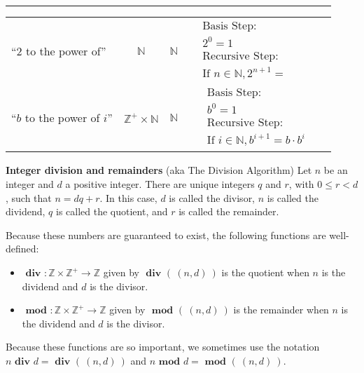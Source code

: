 \documentclass[12pt, oneside]{article}
\begin{document}
\begin{center}
\begin{tabular}{p{0.65in}ccp{2.4in}p{2.4in}}
{\begin{align*}
    \end{align*}}\\
\hline
``$2$ to the power of''& $\mathbb{N}$ & $\mathbb{N}$ & 
{\begin{align*}    
&\textrm{Basis Step:} \\
&2^0= 1 \\
&\textrm{Recursive Step:}\\
&\textrm{If } n \in \mathbb{N}, 2^{n+1} = \phantom{2 \cdot 2^n}
\end{align*}}\\
\hline
``$b$ to the power of $i$''& $\mathbb{Z}^+ \times \mathbb{N}$ & $\mathbb{N}$ & 
{\begin{align*}    
&\textrm{Basis Step:} \\
&b^0 = 1 \\
&\textrm{Recursive Step:}\\
&\textrm{If } i \in \mathbb{N}, b^{i+1} = b \cdot b^i
\end{align*}}
\end{tabular}
\end{center}

\newpage \newpage


{\bf Integer division and remainders} (aka The Division Algorithm) Let $n$ be an integer 
and $d$ a positive integer. There are unique integers $q$ and $r$, with $0 \leq r < d$, such that 
$n = dq + r$. In this case, $d$ is called the divisor, $n$ is called the dividend, 
$q$ is called the quotient, 
and $r$ is called the remainder. 

Because these numbers are guaranteed to exist, the following functions are well-defined: 
\begin{itemize}\setlength{\leftmargin}{-0.25in}
\item $\textbf{ div } : \mathbb{Z} \times \mathbb{Z}^+ \to \mathbb{Z}$ given by $\textbf{ div } ( ~(n,d)~)$ 
is the quotient when $n$ is the dividend and $d$ is the divisor.
\item $\textbf{ mod } : \mathbb{Z} \times \mathbb{Z}^+ \to \mathbb{Z}$ given by $\textbf{ mod } ( ~(n,d)~)$ 
is the remainder when $n$ is the dividend and $d$ is the divisor.
\end{itemize}
Because these functions are so important, we sometimes use the notation
$n \textbf{ div } d = \textbf{ div } ( ~(n,d)~)$ and $n \textbf{ mod } d = \textbf{ mod } (~(n,d)~)$.
\end{document}
